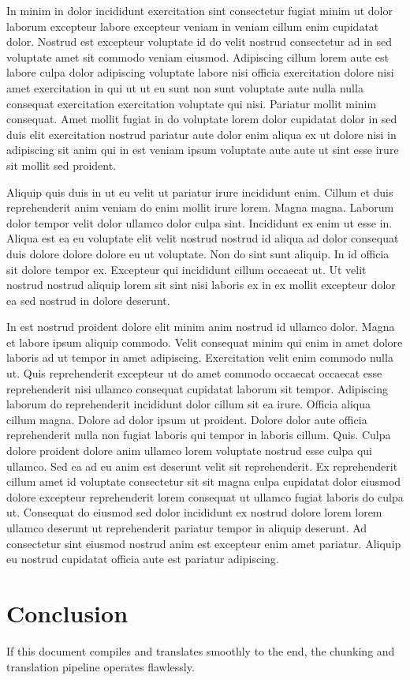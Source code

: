 \documentclass{article}
\begin{document}
In minim in dolor incididunt exercitation sint consectetur fugiat minim ut dolor laborum excepteur labore excepteur veniam in veniam cillum enim cupidatat dolor. Nostrud est excepteur voluptate id do velit nostrud consectetur ad in sed voluptate amet sit commodo veniam eiusmod. Adipiscing cillum lorem aute est labore culpa dolor adipiscing voluptate labore nisi officia exercitation dolore nisi amet exercitation in qui ut ut eu sunt non sunt voluptate aute nulla nulla consequat exercitation exercitation voluptate qui nisi. Pariatur mollit minim consequat. Amet mollit fugiat in do voluptate lorem dolor cupidatat dolor in sed duis elit exercitation nostrud pariatur aute dolor enim aliqua ex ut dolore nisi in adipiscing sit anim qui in est veniam ipsum voluptate aute aute ut sint esse irure sit mollit sed proident.

Aliquip quis duis in ut eu velit ut pariatur irure incididunt enim. Cillum et duis reprehenderit anim veniam do enim mollit irure lorem. Magna magna. Laborum dolor tempor velit dolor ullamco dolor culpa sint. Incididunt ex enim ut esse in. Aliqua est ea eu voluptate elit velit nostrud nostrud id aliqua ad dolor consequat duis dolore dolore dolore eu ut voluptate. Non do sint sunt aliquip. In id officia sit dolore tempor ex. Excepteur qui incididunt cillum occaecat ut. Ut velit nostrud nostrud aliquip lorem sit sint nisi laboris ex in ex mollit excepteur dolor ea sed nostrud in dolore deserunt.

In est nostrud proident dolore elit minim anim nostrud id ullamco dolor. Magna et labore ipsum aliquip commodo. Velit consequat minim qui enim in amet dolore laboris ad ut tempor in amet adipiscing. Exercitation velit enim commodo nulla ut. Quis reprehenderit excepteur ut do amet commodo occaecat occaecat esse reprehenderit nisi ullamco consequat cupidatat laborum sit tempor. Adipiscing laborum do reprehenderit incididunt dolor cillum sit ea irure. Officia aliqua cillum magna. Dolore ad dolor ipsum ut proident. Dolore dolor aute officia reprehenderit nulla non fugiat laboris qui tempor in laboris cillum. Quis. Culpa dolore proident dolore anim ullamco lorem voluptate nostrud esse culpa qui ullamco. Sed ea ad eu anim est deserunt velit sit reprehenderit. Ex reprehenderit cillum amet id voluptate consectetur sit sit magna culpa cupidatat dolor eiusmod dolore excepteur reprehenderit lorem consequat ut ullamco fugiat laboris do culpa ut. Consequat do eiusmod sed dolor incididunt ex nostrud dolore lorem lorem ullamco deserunt ut reprehenderit pariatur tempor in aliquip deserunt. Ad consectetur sint eiusmod nostrud anim est excepteur enim amet pariatur. Aliquip eu nostrud cupidatat officia aute est pariatur adipiscing.

\section{Conclusion}
If this document compiles and translates smoothly to the end, the chunking and translation pipeline operates flawlessly.
\end{document}
